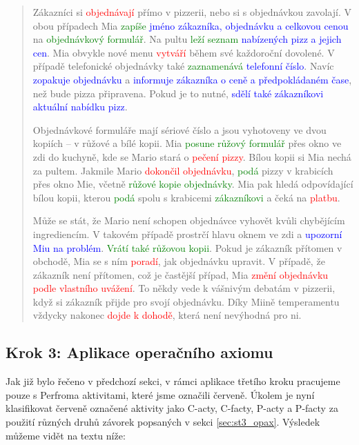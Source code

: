 \begin{quote}
Zákazníci si \textcolor{red}{objednávají} přímo v pizzerii, nebo si s objednávkou zavolají. V obou případech Mia \textcolor{green}{zapíše} \textcolor{blue}{jméno zákazníka, objednávku a celkovou cenou} na \textcolor{green}{objednávkový formulář}. Na pultu \textcolor{green}{leží seznam} \textcolor{blue}{nabízených pizz a jejich cen}. Mia obvykle nové menu \textcolor{red}{vytváří} během své každoroční dovolené. V případě telefonické objednávky také \textcolor{green}{zaznamenává} \textcolor{blue}{telefonní číslo}. Navíc \textcolor{blue}{zopakuje objednávku} a \textcolor{blue}{informuje zákazníka o ceně a předpokládaném čase}, než bude pizza připravena. Pokud je to nutné, \textcolor{blue}{sdělí také zákazníkovi aktuální  nabídku pizz}. 

Objednávkové formuláře mají sériové číslo a jsou vyhotoveny ve dvou kopiích – v růžové a bílé kopii. Mia \textcolor{green}{posune růžový formulář} přes okno ve zdi do kuchyně, kde se Mario stará o \textcolor{red}{pečení pizzy}. Bílou kopii si Mia nechá za pultem. Jakmile Mario \textcolor{red}{dokončil objednávku}, \textcolor{green}{podá} pizzy v krabicích přes okno Mie, včetně \textcolor{green}{růžové kopie objednávky}. Mia pak hledá odpovídající bílou kopii, kterou \textcolor{green}{podá} spolu s krabicemi \textcolor{green}{zákazníkovi} a čeká na \textcolor{red}{platbu}. 

Může se stát, že Mario není schopen objednávce vyhovět kvůli chybějícím ingrediencím. V takovém případě prostrčí hlavu oknem ve zdi a \textcolor{blue}{upozorní Miu na problém}. \textcolor{green}{Vrátí také růžovou kopii}. Pokud je zákazník přítomen v obchodě, Mia se s ním \textcolor{red}{poradí}, jak objednávku upravit. V případě, že zákazník není přítomen, což je častější případ, Mia \textcolor{red}{změní objednávku podle vlastního uvážení}. To někdy vede k vášnivým debatám v pizzerii, když si zákazník přijde pro svojí objednávku. Díky Miině temperamentu vždycky nakonec \textcolor{red}{dojde k dohodě}, která není nevýhodná pro ni.
\end{quote}

\subsection{Krok 3: Aplikace operačního axiomu}
Jak již bylo řečeno v předchozí sekci, v rámci aplikace třetího kroku pracujeme pouze s Perfroma aktivitami, které jsme označili červeně. Úkolem je nyní klasifikovat červeně označené aktivity jako C-acty, C-facty, P-acty a P-facty za použití různých druhů závorek popsaných v sekci \ref{sec:st3_opax}. Výsledek můžeme vidět na textu níže:

